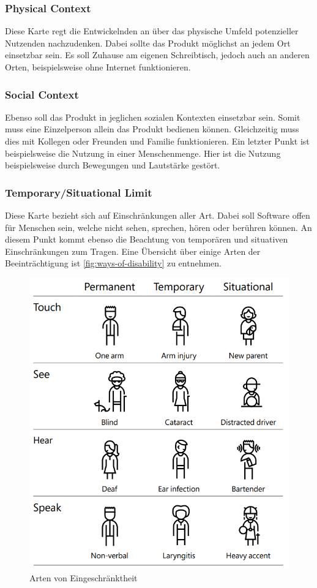 \subsubsection{Physical Context}

Diese Karte regt die Entwickelnden an über das physische Umfeld potenzieller  Nutzenden nachzudenken.
Dabei sollte das Produkt möglichst an jedem Ort einsetzbar sein.
Es soll Zuhause am eigenen Schreibtisch, jedoch auch an anderen Orten, beispielsweise ohne Internet funktionieren.

\subsubsection{Social Context}

Ebenso soll das Produkt in jeglichen sozialen Kontexten einsetzbar sein.
Somit muss eine Einzelperson allein das Produkt bedienen können.
Gleichzeitig muss dies mit Kollegen oder Freunden und Familie funktionieren.
Ein letzter Punkt ist beispielsweise die Nutzung in einer Menschenmenge.
Hier ist die Nutzung beispielsweise durch Bewegungen und Lautstärke gestört.

\subsubsection{Temporary/Situational Limit}

Diese Karte bezieht sich auf Einschränkungen aller Art.
Dabei soll Software offen für Menschen sein, welche nicht sehen, sprechen, hören oder berühren können.
An diesem Punkt kommt ebenso die Beachtung von temporären und situativen Einschränkungen zum Tragen.
Eine Übersicht über einige Arten der Beeinträchtigung ist \autoref{fig:ways-of-disability} zu entnehmen.

\begin{figure}[htp]
    \centering
    \includegraphics[width=.8\textwidth]{images/ID-disabilities.png}
    \caption{Arten von Eingeschränktheit \cite{ITToolkit}}
    \label{fig:ways-of-disability}
\end{figure}

